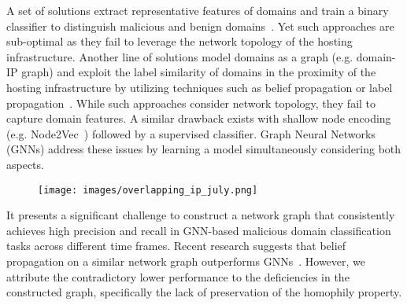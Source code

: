 A set of solutions extract representative features of domains and train a binary classifier to distinguish malicious and benign domains~\cite{Notos_Antonakakis2010, bilge:2014:Exposure,  lexical2015, page:2019:mal, schuppen:fanci:usenix:2018}. Yet such approaches are sub-optimal as they fail to leverage the network topology of the hosting infrastructure. Another line of solutions model domains as a graph (e.g. domain-IP graph) and exploit the label similarity of domains in the proximity of the hosting infrastructure by utilizing techniques such as belief propagation or label propagation~\cite{polonium:SIAM:2011, nazca:NDSS:2014, bp_mal2:2020, marmite:CCS:2017}. While such approaches consider network topology, they fail to capture domain features. A similar drawback exists with shallow node encoding (e.g. Node2Vec~\cite{node2vec:sigkdd:2016}) followed by a supervised classifier. 
Graph Neural Networks (GNNs) address these issues by learning a model simultaneously considering both aspects. 
\begin{figure}[t]
\centering
\texttt{[image: images/overlapping\_ip\_july.png]}
\caption{}
\label{fig:overlapping_ip_july}
\vspace{-2mm}
\end{figure}
It presents a significant challenge to construct a network graph that consistently achieves high precision and recall in GNN-based malicious domain classification tasks across different time frames. Recent research suggests that belief propagation on a similar network graph outperforms GNNs~\cite{BPPhishingCCS:2022}. However, we attribute the contradictory lower performance to the deficiencies in the constructed graph, specifically the lack of preservation of the homophily property. 

